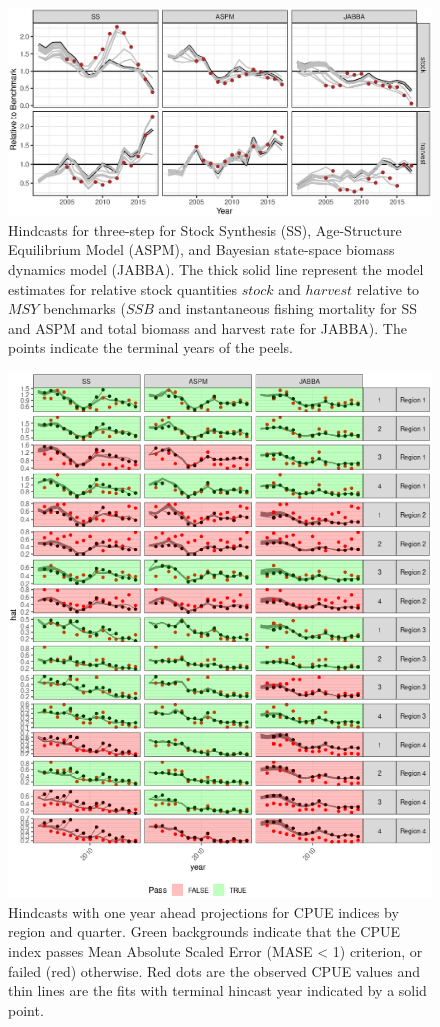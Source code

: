 \documentclass[12pt,halfline,a4paper,nonumbib]{ouparticle}
\begin{document}
\begin{figure}
\centering
\includegraphics[width=6in]{fig3.eps}
\caption{Hindcasts for three-step for Stock Synthesis (SS),  Age-Structure Equilibrium Model (ASPM), and Bayesian state-space biomass dynamics model (JABBA).  The thick solid line represent the model estimates for relative stock quantities $stock$ and $harvest$ relative to $MSY$ benchmarks ($SSB$ and instantaneous fishing mortality for SS and ASPM and total biomass and harvest rate for JABBA). The points indicate the terminal years of the peels.}
\label{fig:retro3}
\end{figure}


\begin{figure}[htbp]
\centering
\includegraphics[width=6in]{fig4.eps}
\caption{Hindcasts with one year ahead projections for CPUE indices by region and quarter. Green backgrounds indicate that the CPUE index passes Mean Absolute Scaled Error (MASE < 1) criterion, or failed (red) otherwise. Red dots are the observed CPUE values and thin lines are the fits with terminal hincast year indicated by a solid point.}
\label{fig:hy}
\end{figure}
\end{document}
